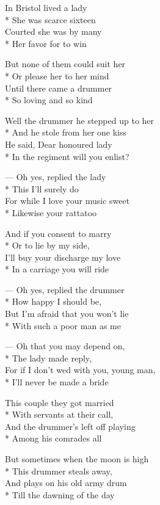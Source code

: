 
\contd
{}

\versemark
In Bristol lived a lady\\*
She was scarce sixteen\\
Courted she was by many\\*
Her favor for to win

\versemark
But none of them could suit her\\*
Or please her to her mind\\
Until there came a drummer\\*
So loving and so kind

\versemark
Well the drummer he stepped up to her\\*
And he stole from her one kiss\\
He said, Dear honoured lady\\*
In the regiment will you enlist?

\versemark
— Oh yes, replied the lady\\*
This I’ll surely do\\
For while I love your music sweet\\*
Likewise your rattatoo

\versemark
And if you consent to marry\\*
Or to lie by my side,\\
I’ll buy your discharge my love\\*
In a carriage you will ride

\versemark
— Oh yes, replied the drummer\\*
How happy I should be,\\
But I’m afraid that you won’t lie\\*
With such a poor man as me

\versemark
— Oh that you may depend on,\\*
The lady made reply,\\
For if I don’t wed with you, young man,\\*
I’ll never be made a bride

\versemark
This couple they got married\\*
With servants at their call,\\
And the drummer’s left off playing\\*
Among his comrades all

\versemark
But sometimes when the moon is high\\*
This drummer steals away,\\
And plays on his old army drum\\*
Till the dawning of the day

